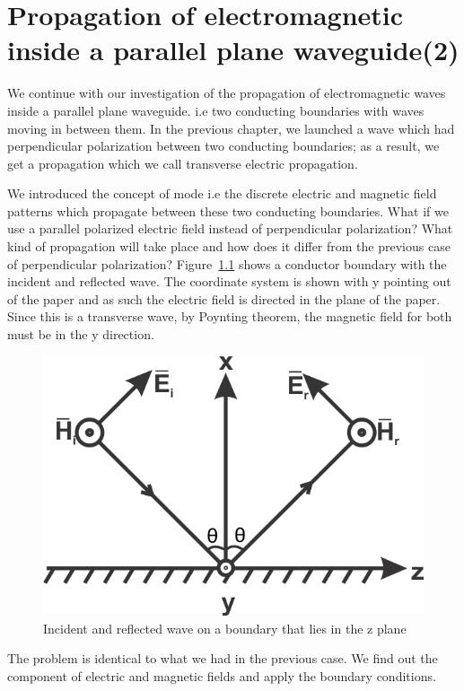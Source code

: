 \chapter{Propagation of electromagnetic inside a parallel plane waveguide(2)}
We continue with our investigation of the propagation of electromagnetic waves inside a parallel plane waveguide. i.e two conducting boundaries with waves moving in between them. In the previous chapter, we launched a wave which had perpendicular polarization between two conducting boundaries; as a result, we get a propagation which we call transverse electric propagation.

We introduced the concept of mode i.e the discrete electric and magnetic field patterns which propagate between these two conducting boundaries. What if we use a parallel polarized electric field instead of perpendicular polarization? What kind of propagation will take place and how does it differ from the previous case of perpendicular polarization? Figure~\ref{fig:silas1} shows a conductor boundary with the incident and reflected wave. The coordinate system is shown with y pointing out of the paper and as such the electric field is directed in the plane of the paper. Since this is a transverse wave, by Poynting theorem, the magnetic field for both must be in the y direction.
\begin{figure}[h]
\centering
\includegraphics[scale=1]{./graphics/silas1}
\caption{Incident and reflected wave on a boundary that lies in the z plane}
\label{fig:silas1}
\end{figure}
The problem is identical to what we had in the previous case. We find out the component of electric and magnetic fields and apply the boundary conditions.
